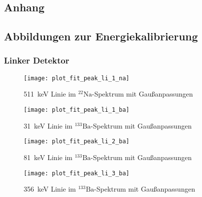 \documentclass[11pt, ngerman, fleqn, DIV=15, headinclude, BCOR=2cm]{scrreprt}
\begin{document}

\begin{appendix}
\chapter{Anhang}

\section{Abbildungen zur Energiekalibrierung} \label{anhang-energiekalibrierung}

\subsection{Linker Detektor}
\begin{figure}[h]
    \centering
    \texttt{[image: plot\_fit\_peak\_li\_1\_na]}
    \caption{%
	    \SI{511}{\kilo\electronvolt} Linie im $^{22}\text{Na}$-Spektrum mit
	    Gaußanpassungen
   }
    \label{fig:plot_fit_peak_li_1_Na}
\end{figure}
\begin{figure}[h]
    \centering
    \texttt{[image: plot\_fit\_peak\_li\_1\_ba]}
    \caption{%
	    \SI{31}{\kilo\electronvolt} Linie im $^{133}\text{Ba}$-Spektrum mit
	    Gaußanpassungen
   }
    \label{fig:plot_fit_peak_li_1_Ba}
\end{figure}
\begin{figure}[h]
    \centering
    \texttt{[image: plot\_fit\_peak\_li\_2\_ba]}
    \caption{%
	    \SI{81}{\kilo\electronvolt} Linie im $^{133}\text{Ba}$-Spektrum mit
	    Gaußanpassungen
   }
    \label{fig:plot_fit_peak_li_2_Ba}
\end{figure}
\begin{figure}[h]
    \centering
    \texttt{[image: plot\_fit\_peak\_li\_3\_ba]}
    \caption{%
	    \SI{356}{\kilo\electronvolt} Linie im $^{133}\text{Ba}$-Spektrum mit
	    Gaußanpassungen
   }
    \label{fig:plot_fit_peak_li_3_Ba}
\end{figure}
\clearpage


\end{appendix}
\end{document}
